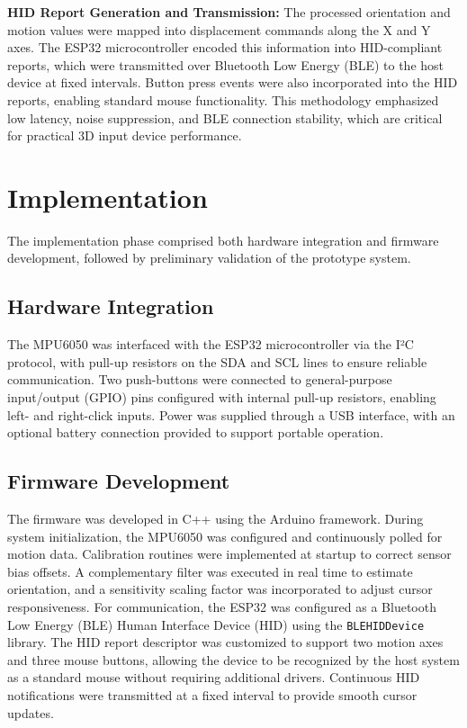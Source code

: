 \documentclass[10pt]{article}
\begin{document}
\textbf{HID Report Generation and Transmission:}
The processed orientation and motion values were mapped into displacement 
commands along the X and Y axes. The ESP32 microcontroller encoded this 
information into HID-compliant reports, which were transmitted over Bluetooth 
Low Energy (BLE) to the host device at fixed intervals. Button press events were 
also incorporated into the HID reports, enabling standard mouse functionality. 
This methodology emphasized low latency, noise suppression, and BLE connection 
stability, which are critical for practical 3D input device performance.




\section*{Implementation}

The implementation phase comprised both hardware integration and firmware 
development, followed by preliminary validation of the prototype system.

\subsection*{Hardware Integration}
The MPU6050 was interfaced with the ESP32 microcontroller via the I²C protocol, 
with pull-up resistors on the SDA and SCL lines to ensure reliable communication. 
Two push-buttons were connected to general-purpose input/output (GPIO) pins 
configured with internal pull-up resistors, enabling left- and right-click 
inputs. Power was supplied through a USB interface, with an optional battery 
connection provided to support portable operation.

\subsection*{Firmware Development}
The firmware was developed in C++ using the Arduino framework. During system 
initialization, the MPU6050 was configured and continuously polled for motion 
data. Calibration routines were implemented at startup to correct sensor bias 
offsets. A complementary filter was executed in real time to estimate 
orientation, and a sensitivity scaling factor was incorporated to adjust cursor 
responsiveness.  
For communication, the ESP32 was configured as a Bluetooth Low Energy (BLE) 
Human Interface Device (HID) using the \texttt{BLEHIDDevice} library. The HID 
report descriptor was customized to support two motion axes and three mouse 
buttons, allowing the device to be recognized by the host system as a standard 
mouse without requiring additional drivers. Continuous HID notifications were 
transmitted at a fixed interval to provide smooth cursor updates.
\end{document}

